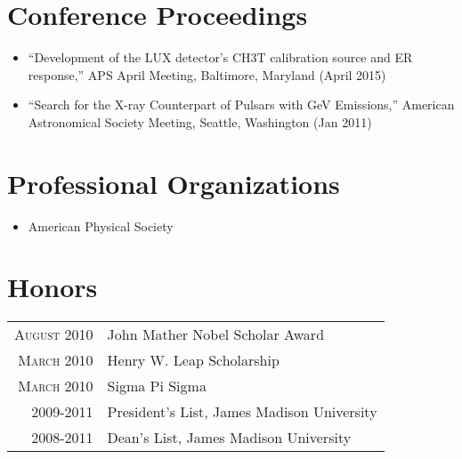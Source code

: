 \documentclass[a4paper,10pt]{article}
\begin{document}
\section{Conference Proceedings}
\begin{itemize}

\item ``Development of the LUX detector's CH3T calibration source and ER response,'' APS April Meeting, Baltimore, Maryland (April 2015)

\item ``Search for the X-ray Counterpart of Pulsars with GeV Emissions,'' American \newline Astronomical Society Meeting, Seattle, Washington (Jan 2011)

\end{itemize}

\section{Professional Organizations}
\begin{itemize}

\item American Physical Society

\end{itemize}


\section{Honors}
\begin{tabular}{rl}
 \textsc{August} 2010 & John Mather Nobel Scholar Award \\
\textsc{March} 2010 & Henry W. Leap Scholarship \\
\textsc{March} 2010 & Sigma Pi Sigma \\
2009-2011 & President's List, James Madison University \\
2008-2011 & Dean's List, James Madison University \\
\end{tabular}



\end{document}
